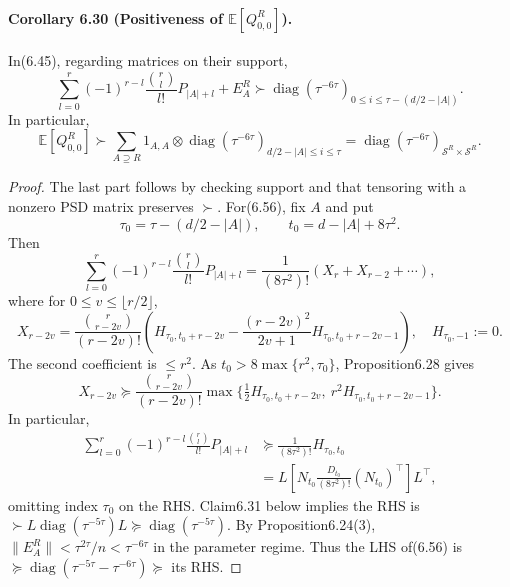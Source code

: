 \paragraph{Corollary 6.30 (Positiveness of $\mathbb E[Q_{0,0}^R]$).} In(6.45), regarding matrices on their support,
\[\sum_{l=0}^r(-1)^{r-l}\frac{\binom rl}{l!}P_{|A|+l}+E_A^R\succ\operatorname{diag}(\tau^{-6\tau})_{0\le i\le\tau-(d/2-|A|)}.\tag{6.56}\]
In particular,
\[\mathbb E[Q_{0,0}^R]\succ\sum_{A\supseteq R}1_{A,A}\otimes\operatorname{diag}(\tau^{-6\tau})_{d/2-|A|\le i\le\tau}=\operatorname{diag}(\tau^{-6\tau})_{\mathcal S^R\times\mathcal S^R}.\tag{6.57}\]
\begin{proof}The last part follows by checking support and that tensoring with a nonzero PSD matrix preserves $\succ$. For(6.56), fix $A$ and put
\[\tau_0=\tau-(d/2-|A|),\qquad t_0=d-|A|+8\tau^2.\tag{6.58}\]
Then
\[\sum_{l=0}^r(-1)^{r-l}\frac{\binom rl}{l!}P_{|A|+l}=\frac1{(8\tau^2)!}(X_r+X_{r-2}+\cdots),\tag{6.59}\]
where for $0\le v\le\lfloor r/2\rfloor$,
\[X_{r-2v}=\frac{\binom r{r-2v}}{(r-2v)!}\left(H_{\tau_0,t_0+r-2v}-\frac{(r-2v)^2}{2v+1}H_{\tau_0,t_0+r-2v-1}\right),\quad H_{\tau_0,-1}:=0.\]
The second coefficient is $\le r^2$. As $t_0>8\max\{r^2,\tau_0\}$, Proposition6.28 gives
\[X_{r-2v}\succeq\frac{\binom r{r-2v}}{(r-2v)!}\max\{\tfrac12H_{\tau_0,t_0+r-2v},\ r^2H_{\tau_0,t_0+r-2v-1}\}.\]
In particular,
\begin{align*}\sum_{l=0}^r(-1)^{r-l}\frac{\binom rl}{l!}P_{|A|+l}&\succeq\frac1{(8\tau^2)!}H_{\tau_0,t_0}\\&=L[N_{t_0}\tfrac{D_{t_0}}{(8\tau^2)!}(N_{t_0})^\top]L^\top,\tag{6.60}\end{align*}
omitting index $\tau_0$ on the RHS. Claim6.31 below implies the RHS is $\succ L\operatorname{diag}(\tau^{-5\tau})L\succeq\operatorname{diag}(\tau^{-5\tau})$. By Proposition6.24(3), $\|E_A^R\|<\tau^{2\tau}/n<\tau^{-6\tau}$ in the parameter regime. Thus the LHS of(6.56) is $\succeq\operatorname{diag}(\tau^{-5\tau}-\tau^{-6\tau})\succeq$ its RHS.\end{proof}
